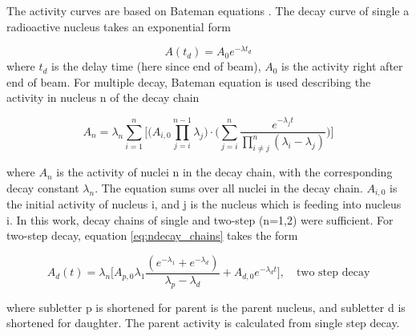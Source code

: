 The activity curves are based on Bateman equations \cite{PopO.M.SimulikV.M.2016}. The decay curve of single a radioactive nucleus takes an exponential form

\begin{equation} \label{eq:singledecay}
    A(t_d)=A_0 e^{-\lambda t_d}
\end{equation} 
where $t_d$ is the delay time (here since end of beam), $A_0$ is the activity right after end of beam. For multiple decay, Bateman equation is used describing the activity in nucleus n of the decay chain

\begin{equation} \label{eq:ndecay_chains}
    A_n = \lambda_n \sum_{i=1}^n \Big[ \Big( A_{i,0}\prod^{n-1}_{j=i}\lambda_j \Big)\cdot \Big( \sum_{j=i}^n \frac{e^{-\lambda_j t}}{\prod_{i\neq j}^n (\lambda_i - \lambda_j)} \Big) \Big]
\end{equation}

where $A_n$ is the activity of nuclei n in the decay chain, with the corresponding decay constant $\lambda_n$. The equation sums over all nuclei in the decay chain. $A_{i,0}$ is the initial activity of nucleus i, and j is the nucleus which is feeding into nucleus i. In this work, decay chains of single and two-step (n=1,2) were sufficient. For two-step decay, equation \ref{eq:ndecay_chains} takes the form

\begin{equation} \label{eq:twostep_activity}
    A_d(t) = \lambda_n \Big[ A_{p,0}\lambda_1 \frac{(e^{-\lambda_1 } + e^{-\lambda_d})}{\lambda_p - \lambda _d} + A_{d,0}e^{-\lambda_d t} \Big],\quad \text{two step decay}
\end{equation}

where subletter p is shortened for parent is the parent nucleus, and subletter d is shortened for daughter. The parent activity is calculated from single step decay. \\






